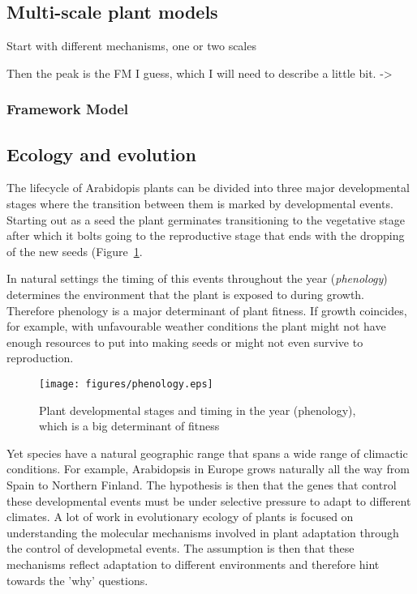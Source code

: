 \documentclass[phd]{infthesis}
\newcommand{\todo}[1]{\mrcolor{red}{TODO: #1}}
\begin{document}
\subsection{Multi-scale plant models}
Start with different mechanisms, one or two scales

Then the peak is the FM I guess, which I will need to describe a little bit.
->
\subsubsection*{Framework Model}


\subsection{Ecology and evolution}
The lifecycle of Arabidopis plants can be divided into three major
developmental stages where the transition between them is marked by
developmental events. Starting out as a seed the plant germinates transitioning
to the vegetative stage after which it bolts going to the reproductive stage
that ends with the dropping of the new seeds (Figure~\ref{fig:plantLife}.

In natural settings the timing of this events throughout the year
(\emph{phenology}) determines the environment that the plant is exposed to
during growth. Therefore phenology is a major determinant of plant fitness. If
growth coincides, for example, with unfavourable weather conditions the plant
might not have enough resources to put into making seeds or might not even
survive to reproduction.

\begin{figure}[tb]
\centering
\texttt{[image: figures/phenology.eps]}
  \caption{Plant developmental stages and timing in the year (phenology), which
    is a big determinant of fitness}
\label{fig:plantLife}
\end{figure}

Yet species have a natural geographic range that spans a wide range of climactic
conditions. For example, Arabidopsis in Europe grows naturally all the way from
Spain to Northern Finland. The hypothesis is then that the genes that control
these developmental events must be under selective pressure to adapt to
different climates. A lot of work in evolutionary ecology of plants is focused
on understanding the molecular mechanisms involved in plant adaptation through
the control of developmetal events. The assumption is then that these mechanisms
reflect adaptation to different environments and therefore hint towards the
'why' questions.
\end{document}
